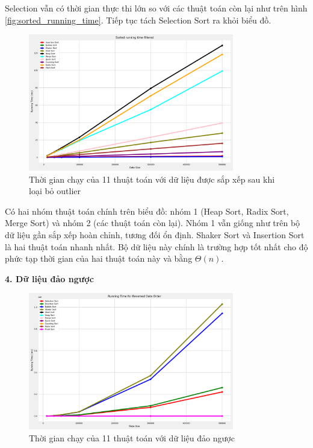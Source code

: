 Selection vẫn có thời gian thực thi lớn so với các thuật toán còn lại như trên hình \ref{fig:sorted_running_time}. Tiếp tục tách Selection Sort ra khỏi biểu đồ.

\begin{figure}[H]
    \centering
    \includegraphics[width=0.8\textwidth]{exprimental_result/images/sorted_running_time_filtered.png}
    \caption{Thời gian chạy của 11 thuật toán với dữ liệu được sắp xếp sau khi loại bỏ outlier}
    \label{fig:sorted_running_time_filtered}
\end{figure}

Có hai nhóm thuật toán chính trên biểu đồ: nhóm 1 (Heap Sort, Radix Sort, Merge Sort) và nhóm 2 (các thuật toán còn lại). Nhóm 1 vẫn giống như trên bộ dữ liệu gần sắp xếp hoàn chỉnh, tương đối ổn định. Shaker Sort và Insertion Sort là hai thuật toán nhanh nhất. Bộ dữ liệu này chính là trường hợp tốt nhất cho độ phức tạp thời gian của hai thuật toán này và bằng $\Theta(n)$.

\textbf{4. Dữ liệu đảo ngược}

\begin{figure}[H]
    \centering
    \includegraphics[width=0.8\textwidth]{exprimental_result/images/reversed_running_time.png}
    \caption{Thời gian chạy của 11 thuật toán với dữ liệu đảo ngược}
    \label{fig:reversed_running_time}
\end{figure}

